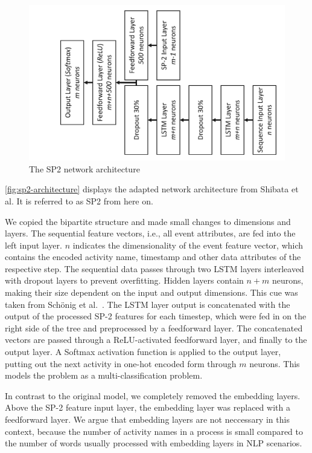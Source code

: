 \begin{figure}[!htb]
    \centering
    \includegraphics[width=.8\textwidth, angle=-90,origin=c]{gfx/sp2-network-architecture.pdf}
    \caption{The SP2 network architecture}
    \label{fig:sp2-architecture}
\end{figure}

\autoref{fig:sp2-architecture} displays the adapted network architecture from Shibata et al. It is referred to as SP2 from here on.

We copied the bipartite structure and made small changes to dimensions and layers.
The sequential feature vectors, i.e., all event attributes, are fed into the left input layer.
$n$ indicates the dimensionality of the event feature vector, which contains the encoded activity name, timestamp and other data attributes of the respective step.
The sequential data passes through two LSTM layers interleaved with dropout layers to prevent overfitting.
Hidden layers contain $n+m$ neurons, making their size dependent on the input and output dimensions.
This cue was taken from Schönig et al.~\cite{schoenig2018}.
The LSTM layer output is concatenated with the output of the processed SP-2 features for each timestep, which were fed in on the right side of the tree and preprocessed by a feedforward layer.
The concatenated vectors are passed through a ReLU-activated feedforward layer, and finally to the output layer.
A Softmax activation function is applied to the output layer, putting out the next activity in one-hot encoded form through $m$ neurons.
This models the problem as a multi-classification problem.

In contrast to the original model, we completely removed the embedding layers.
Above the SP-2 feature input layer, the embedding layer was replaced with a feedforward layer.
We argue that embedding layers are not neccessary in this context, because the number of activity names in a process is small compared to the number of words usually processed with embedding layers in NLP scenarios.


